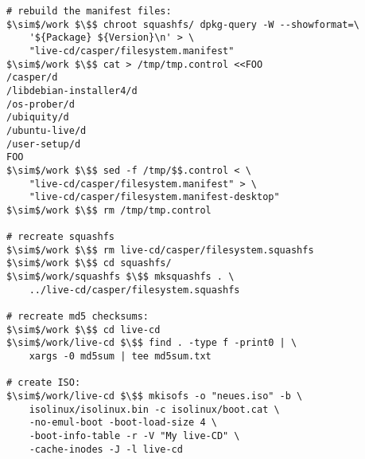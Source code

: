 \begin{lstlisting}[caption={Rebuiling the live-CD},float=ht,label={code:rebuild}]
# rebuild the manifest files:
$\sim$/work $\$$ chroot squashfs/ dpkg-query -W --showformat=\
	'${Package} ${Version}\n' > \
	"live-cd/casper/filesystem.manifest"
$\sim$/work $\$$ cat > /tmp/tmp.control <<FOO
/casper/d
/libdebian-installer4/d
/os-prober/d
/ubiquity/d
/ubuntu-live/d
/user-setup/d
FOO 
$\sim$/work $\$$ sed -f /tmp/$$.control < \
	"live-cd/casper/filesystem.manifest" > \
	"live-cd/casper/filesystem.manifest-desktop"
$\sim$/work $\$$ rm /tmp/tmp.control

# recreate squashfs
$\sim$/work $\$$ rm live-cd/casper/filesystem.squashfs
$\sim$/work $\$$ cd squashfs/
$\sim$/work/squashfs $\$$ mksquashfs . \
	../live-cd/casper/filesystem.squashfs

# recreate md5 checksums:
$\sim$/work $\$$ cd live-cd
$\sim$/work/live-cd $\$$ find . -type f -print0 | \
	xargs -0 md5sum | tee md5sum.txt

# create ISO:
$\sim$/work/live-cd $\$$ mkisofs -o "neues.iso" -b \
	isolinux/isolinux.bin -c isolinux/boot.cat \
	-no-emul-boot -boot-load-size 4 \
	-boot-info-table -r -V "My live-CD" \
	-cache-inodes -J -l live-cd
\end{lstlisting}
